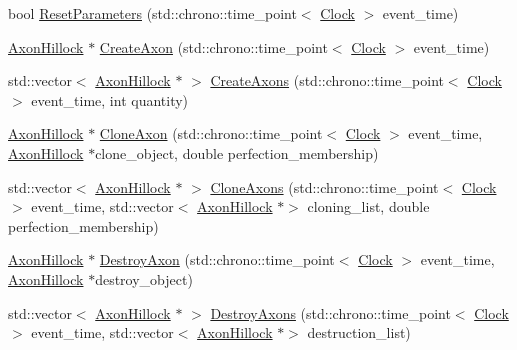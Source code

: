 \begin{DoxyCompactItemize}
\item 
bool \mbox{\hyperlink{classAxonHillock_acec1571ef0b74f7f5ce6699c9b459b4f}{Reset\+Parameters}} (std\+::chrono\+::time\+\_\+point$<$ \mbox{\hyperlink{universe_8h_a0ef8d951d1ca5ab3cfaf7ab4c7a6fd80}{Clock}} $>$ event\+\_\+time)
\item 
\mbox{\hyperlink{classAxonHillock}{Axon\+Hillock}} $\ast$ \mbox{\hyperlink{classAxonHillock_ae6b18ec6f2921b9d4461b89a9d72ab25}{Create\+Axon}} (std\+::chrono\+::time\+\_\+point$<$ \mbox{\hyperlink{universe_8h_a0ef8d951d1ca5ab3cfaf7ab4c7a6fd80}{Clock}} $>$ event\+\_\+time)
\item 
std\+::vector$<$ \mbox{\hyperlink{classAxonHillock}{Axon\+Hillock}} $\ast$ $>$ \mbox{\hyperlink{classAxonHillock_a15bf1a433f38b8b0c92e4a4efe22ec6f}{Create\+Axons}} (std\+::chrono\+::time\+\_\+point$<$ \mbox{\hyperlink{universe_8h_a0ef8d951d1ca5ab3cfaf7ab4c7a6fd80}{Clock}} $>$ event\+\_\+time, int quantity)
\item 
\mbox{\hyperlink{classAxonHillock}{Axon\+Hillock}} $\ast$ \mbox{\hyperlink{classAxonHillock_ad54833cee03cfcacb5e88d174048aaa4}{Clone\+Axon}} (std\+::chrono\+::time\+\_\+point$<$ \mbox{\hyperlink{universe_8h_a0ef8d951d1ca5ab3cfaf7ab4c7a6fd80}{Clock}} $>$ event\+\_\+time, \mbox{\hyperlink{classAxonHillock}{Axon\+Hillock}} $\ast$clone\+\_\+object, double perfection\+\_\+membership)
\item 
std\+::vector$<$ \mbox{\hyperlink{classAxonHillock}{Axon\+Hillock}} $\ast$ $>$ \mbox{\hyperlink{classAxonHillock_aa65cead56b10bda66dc256c68764a553}{Clone\+Axons}} (std\+::chrono\+::time\+\_\+point$<$ \mbox{\hyperlink{universe_8h_a0ef8d951d1ca5ab3cfaf7ab4c7a6fd80}{Clock}} $>$ event\+\_\+time, std\+::vector$<$ \mbox{\hyperlink{classAxonHillock}{Axon\+Hillock}} $\ast$$>$ cloning\+\_\+list, double perfection\+\_\+membership)
\item 
\mbox{\hyperlink{classAxonHillock}{Axon\+Hillock}} $\ast$ \mbox{\hyperlink{classAxonHillock_a031b2cc7292d023506a5124639a941a7}{Destroy\+Axon}} (std\+::chrono\+::time\+\_\+point$<$ \mbox{\hyperlink{universe_8h_a0ef8d951d1ca5ab3cfaf7ab4c7a6fd80}{Clock}} $>$ event\+\_\+time, \mbox{\hyperlink{classAxonHillock}{Axon\+Hillock}} $\ast$destroy\+\_\+object)
\item 
std\+::vector$<$ \mbox{\hyperlink{classAxonHillock}{Axon\+Hillock}} $\ast$ $>$ \mbox{\hyperlink{classAxonHillock_a083c918c64c60f3cea1d39aa8e0c6fba}{Destroy\+Axons}} (std\+::chrono\+::time\+\_\+point$<$ \mbox{\hyperlink{universe_8h_a0ef8d951d1ca5ab3cfaf7ab4c7a6fd80}{Clock}} $>$ event\+\_\+time, std\+::vector$<$ \mbox{\hyperlink{classAxonHillock}{Axon\+Hillock}} $\ast$$>$ destruction\+\_\+list)

\end{DoxyCompactItemize}
